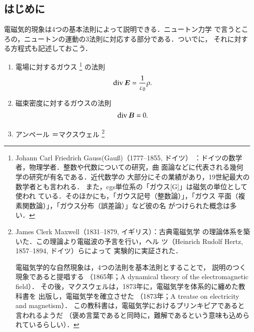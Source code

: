         \subsection{はじめに}\label{subseq:4fundlaw_Hajimeni}
        電磁気的現象は4つの基本法則によって説明できる．ニュートン力学
        で言うところの，ニュートンの運動の3法則に対応する部分である．ついでに，
        それに対する方程式も記述しておこう．
            \begin{enumerate}
                \item 電場に対するガウス
                    \footnote{
                        Johann Carl Friedrich Gauss(Gau\ss)（1777--1855, ドイツ）
                        ：ドイツの数学者，物理学者．整数や代数についての研究，曲
                        面論などに代表される幾何学の研究が有名である．近代数学の
                        大部分にその業績があり，19世紀最大の数学者とも言われる．
                        また，cgs単位系の「ガウス[G]」は磁気の単位として使われ
                        ている．そのほかにも，「ガウス記号（整数論）」，「ガウス
                        平面（複素関数論）」，「ガウス分布（誤差論）」など彼の名
                        がつけられた概念は多い．
                    }
                    の法則
                    \begin{align}
                        \mathrm{div}\, \boldsymbol{E} = \frac{1}{\varepsilon_{0}}\rho.
                    \end{align}
                \item 磁束密度に対するガウスの法則
                    \begin{align}
                        \mathrm{div}\, \boldsymbol{B} = 0.
                    \end{align}
                \item アンペール
                    ＝マクスウェル
                    \footnote{
                        James Clerk Maxwell（1831--1879, イギリス）：古典電磁気学
                        の理論体系を築いた．この理論より電磁波の予言を行い，ヘル
                        ツ（Heinrich Rudolf Hertz, 1857--1894, ドイツ）らによって
                        実験的に実証された．

                        電磁気学的な自然現象は，4つの法則を基本法則とすることで，
                        説明のつく現象であると提唱する
                        （1865年；A dynamical theory of the electromagnetic field）．
                        その後，マクスウェルは，1873年に，電磁気学を体系的に纏めた教科書を
                        出版し，電磁気学を確立させた
                        （1873年；A treatse on electricity and magnetism）．
                        この教科書は，電磁気学におけるプリンキピアであると言われるようだ
                        （褒め言葉であると同時に，難解であるという意味も込められているらしい）．

}
\end{enumerate}
